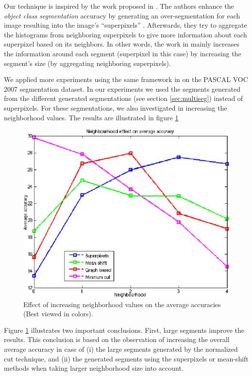 \documentclass{llncs}
\begin{document}
Our technique is inspired by the work proposed in \cite{fulkerson09class}.
The authors enhance the \textit{object class segmentation} accuracy by generating an over-segmentation
for each image resulting into the image's ``superpixels'' \cite{Ren03learninga}. Afterwards, they try to
aggregate the histograms from neighboring superpixels to give more information about each superpixel
based on its neighbors. In other words, the work in \cite{fulkerson09class} mainly increases the
information around each segment (superpixel in this case) by increasing the segment's size
(by aggregating neighboring superpixels).

We applied more experiments using the same framework in \cite{fulkerson09class} on the PASCAL VOC 2007 segmentation dataset.
In our experiments we used the segments generated from the different generated segmentations (see section \ref{sec:multiseg}) instead of superpixels.
For these segmentations, we also investigated in increasing the neighborhood values.
The results are illustrated in figure \ref{fig:neigh_effect}

\begin{figure}[!t]
\includegraphics[scale=.33]{./Figures/neigh_acc.eps}
\centering
\caption{Effect of increasing neighborhood values on the average accuracies (Best viewed in colors).}
\label{fig:neigh_effect}
\end{figure}

Figure \ref{fig:neigh_effect} illustrates two important conclusions. First, large segments improve the
results. This conclusion is based on the observation of increasing the overall average accuracy in case of
(i) the large segments generated by the normalized cut technique, and
(ii) the generated segments using the superpixels or mean-shift methods when taking larger neighborhood
size into account.
\end{document}
